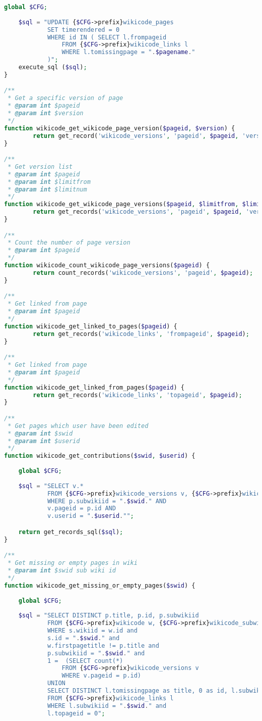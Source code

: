 \begin{lstlisting}[language=PHP]
	global $CFG;
    
    $sql = "UPDATE {$CFG->prefix}wikicode_pages
            SET timerendered = 0
            WHERE id IN ( SELECT l.frompageid
                FROM {$CFG->prefix}wikicode_links l
                WHERE l.tomissingpage = ".$pagename."
            )";
    execute_sql ($sql);
}

/**
 * Get a specific version of page
 * @param int $pageid
 * @param int $version
 */
function wikicode_get_wikicode_page_version($pageid, $version) {
        return get_record('wikicode_versions', 'pageid', $pageid, 'version', $version);
}

/**
 * Get version list
 * @param int $pageid
 * @param int $limitfrom
 * @param int $limitnum
 */
function wikicode_get_wikicode_page_versions($pageid, $limitfrom, $limitnum) {
        return get_records('wikicode_versions', 'pageid', $pageid, 'version DESC', '*', $limitfrom, $limitnum);
}

/**
 * Count the number of page version
 * @param int $pageid
 */
function wikicode_count_wikicode_page_versions($pageid) {
        return count_records('wikicode_versions', 'pageid', $pageid);
}

/**
 * Get linked from page
 * @param int $pageid
 */
function wikicode_get_linked_to_pages($pageid) {
        return get_records('wikicode_links', 'frompageid', $pageid);
}

/**
 * Get linked from page
 * @param int $pageid
 */
function wikicode_get_linked_from_pages($pageid) {
        return get_records('wikicode_links', 'topageid', $pageid);
}

/**
 * Get pages which user have been edited
 * @param int $swid
 * @param int $userid
 */
function wikicode_get_contributions($swid, $userid) {
	
	global $CFG;
    
    $sql = "SELECT v.*
            FROM {$CFG->prefix}wikicode_versions v, {$CFG->prefix}wikicode_pages p
            WHERE p.subwikiid = ".$swid." AND
            v.pageid = p.id AND
            v.userid = ".$userid."";

    return get_records_sql($sql);
}

/**
 * Get missing or empty pages in wiki
 * @param int $swid sub wiki id
 */
function wikicode_get_missing_or_empty_pages($swid) {
	
	global $CFG;
    
    $sql = "SELECT DISTINCT p.title, p.id, p.subwikiid
            FROM {$CFG->prefix}wikicode w, {$CFG->prefix}wikicode_subwikis s, {$CFG->prefix}wikicode_pages p
            WHERE s.wikiid = w.id and
            s.id = ".$swid." and
            w.firstpagetitle != p.title and
            p.subwikiid = ".$swid." and
            1 =  (SELECT count(*)
                FROM {$CFG->prefix}wikicode_versions v
                WHERE v.pageid = p.id)
            UNION
            SELECT DISTINCT l.tomissingpage as title, 0 as id, l.subwikiid
            FROM {$CFG->prefix}wikicode_links l
            WHERE l.subwikiid = ".$swid." and
            l.topageid = 0";


\end{lstlisting}
